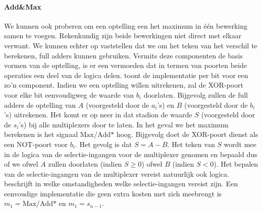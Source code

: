 \paragraph{Add\&Max}We kunnen ook proberen om een optelling een het maximum in \'e\'en bewerking samen te voegen. Rekenkundig zijn beide bewerkingen niet direct met elkaar verwant. We kunnen echter op  vaststellen dat we om het teken van het verschil te berekenen, full adders kunnen gebruiken. Vermits deze componenten de basis vormen van de optelling, is er een vermoeden dat in termen van poorten beide operaties een deel van de logica delen. 
toont de implementatie per bit voor een zo'n component. Indien we een optelling willen uitrekenen, zal de XOR-poort voor elke bit eenvoudigweg de waarde van $b_i$ doorlaten. Bijgevolg zullen de full adders de optelling van $A$ (voorgesteld door de $a_i$'s) en $B$ (voorgesteld door de $b_i$'s) uitrekenen. Het komt er op neer in dat stadion de waarde $S$ (voorgesteld door de $s_i$'s) bij alle multiplexers door te laten. In het geval we het maximum berekenen is het signaal $\mbox{Max/Add*}$ hoog. Bijgevolg doet de XOR-poort dienst als een NOT-poort voor $b_i$. Het gevolg is dat $S=A-B$. Het teken van $S$ wordt mee in de logica van de selectie-ingangen voor de multiplexer genomen en bepaald dus of we ofwel $A$ zullen doorlaten (indien $S\geq 0$) ofwel $B$ (indien $S<0$). Het bepalen van de selectie-ingangen van de multiplexer vereist natuurlijk ook logica. 
beschrijft in welke omstandigheden welke selectie-ingangen vereist zijn. Een eenvoudige implementatie die geen extra kosten met zich meebrengt is $m_1=\mbox{Max/Add*}$ en $m_1=s_{n-1}$.
